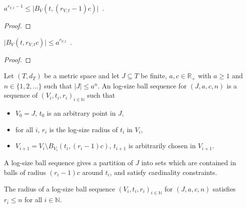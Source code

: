 \begin{lemma}\label{lem:card_logSizeRadius_ge}
  \leanok
$a^{r_{V,t}-1} \le \vert B_V(t, (r_{V,t}-1)c) \vert$~.
\end{lemma}

\begin{proof}\leanok

\end{proof}


\begin{lemma}\label{lem:card_logSizeRadius_le}
  \leanok
$\vert B_V(t, r_{V,t}c) \vert \le a^{r_{V,t}}$~.
\end{lemma}

\begin{proof}\leanok

\end{proof}


\begin{definition}\label{def:logSizeBallSequence}
  \leanok
Let $(T,d_T)$ be a metric space and let $J \subseteq T$ be finite, $a,c \in \mathbb R_+$ with $a \ge 1$ and $n \in \{1, 2, ...\}$ such that $|J| \le a^n$.
An log-size ball sequence for $(J, a, c, n)$ is a sequence of $(V_i, t_i, r_i)_{i \in \mathbb{N}}$ such that
\begin{itemize}
  \item $V_0 = J$, $t_0$ is an arbitrary point in $J$,
  \item for all $i$, $r_i$ is the log-size radius of $t_i$ in $V_i$,
  \item $V_{i+1} = V_i \setminus B_{V_i}(t_i, (r_i - 1)c)$, $t_{i+1}$ is arbitrarily chosen in $V_{i+1}$.
\end{itemize}
\end{definition}

A log-size ball sequence gives a partition of $J$ into sets which are contained in balls of radius $(r_i - 1)c$ around $t_i$, and satisfy cardinality constraints.


\begin{lemma}\label{lem:logSizeRadius_logSizeBallSequence_le}
  \leanok
The radius of a log-size ball sequence $(V_i, t_i, r_i)_{i \in \mathbb{N}}$ for $(J, a, c, n)$ satisfies $r_i \le n$ for all $i \in \mathbb{N}$.
\end{lemma}

